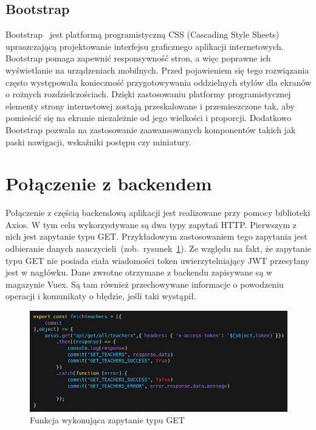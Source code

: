 \subsection{Bootstrap}
Bootstrap~\cite{boot} jest platformą programistyczną CSS (Cascading Style Sheets) upraszczającą projektowanie interfejsu graficznego aplikacji internetowych. Bootstrap pomaga zapewnić responsywność stron, a więc poprawne ich wyświetlanie na urządzeniach mobilnych. Przed pojawieniem się tego rozwiązania często występowała konieczność przygotowywania oddzielnych stylów dla ekranów o rożnych rozdzielczościach. Dzięki zastosowaniu platformy programistycznej elementy strony internetowej zostają przeskalowane i przemieszczone tak, aby pomieścić się na ekranie niezależnie od jego wielkości i proporcji. Dodatkowo Bootstrap pozwala na zastosowanie zaawansowanych komponentów takich jak paski nawigacji, wskaźniki postępu czy miniatury. 
\section{Połączenie z backendem}
Połączenie z częścią backendową aplikacji jest realizowane przy pomocy biblioteki Axios. W tym celu wykorzystywane są dwa typy zapytań HTTP. Pierwszym z nich jest zapytanie typu GET. Przykładowym zastosowaniem tego zapytania jest odbieranie danych nauczycieli~(zob.~rysunek~\ref{rys:get}). Ze względu na fakt, że zapytanie typu GET nie posiada ciała wiadomości token uwierzytelniający JWT przesyłany jest w nagłówku. Dane zwrotne otrzymane z backendu zapisywane są w magazynie Vuex. Są tam również przechowywane informacje o powodzeniu operacji i komunikaty o błędzie, jeśli taki wystąpił.

\begin{figure}[h]
\centering\includegraphics[width=\textwidth]{figures/get}
\caption{Funkcja wykonująca zapytanie typu GET}\label{rys:get}
\end{figure}

